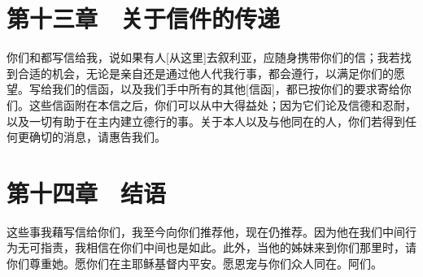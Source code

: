 \section{第十三章　关于信件的传递}

你们和都写信给我，说如果有人[从这里]去叙利亚，应随身携带你们的信；我若找到合适的机会，无论是亲自还是通过他人代我行事，都会遵行，以满足你们的愿望。写给我们的信函，以及我们手中所有的其他[信函]，都已按你们的要求寄给你们。这些信函附在本信之后，你们可以从中大得益处；因为它们论及信德和忍耐，以及一切有助于在主内建立德行的事。关于本人以及与他同在的人，你们若得到任何更确切的消息，请惠告我们。\par


\section{第十四章　结语}

这些事我藉写信给你们，我至今向你们推荐他，现在仍推荐。因为他在我们中间行为无可指责，我相信在你们中间也是如此。此外，当他的姊妹来到你们那里时，请你们尊重她。愿你们在主耶稣基督内平安。愿恩宠与你们众人同在。阿们。\par

